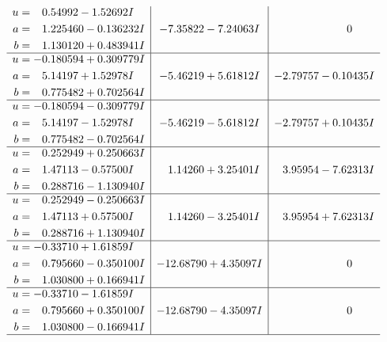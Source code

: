 \documentclass[1p]{elsarticle_modified}
\theoremstyle{definition}
\begin{document}
$$\begin{array}{c|c|c}
\begin{aligned}
u &= \phantom{-}0.54992 - 1.52692 I \\
a &= \phantom{-}1.225460 - 0.136232 I \\
b &= \phantom{-}1.130120 + 0.483941 I\end{aligned}
 & -7.35822 - 7.24063 I & \phantom{-0.000000 } 0 \\ \hline\begin{aligned}
u &= -0.180594 + 0.309779 I \\
a &= \phantom{-}5.14197 + 1.52978 I \\
b &= \phantom{-}0.775482 + 0.702564 I\end{aligned}
 & -5.46219 + 5.61812 I & -2.79757 - 0.10435 I \\ \hline\begin{aligned}
u &= -0.180594 - 0.309779 I \\
a &= \phantom{-}5.14197 - 1.52978 I \\
b &= \phantom{-}0.775482 - 0.702564 I\end{aligned}
 & -5.46219 - 5.61812 I & -2.79757 + 0.10435 I \\ \hline\begin{aligned}
u &= \phantom{-}0.252949 + 0.250663 I \\
a &= \phantom{-}1.47113 - 0.57500 I \\
b &= \phantom{-}0.288716 - 1.130940 I\end{aligned}
 & \phantom{-}1.14260 + 3.25401 I & \phantom{-}3.95954 - 7.62313 I \\ \hline\begin{aligned}
u &= \phantom{-}0.252949 - 0.250663 I \\
a &= \phantom{-}1.47113 + 0.57500 I \\
b &= \phantom{-}0.288716 + 1.130940 I\end{aligned}
 & \phantom{-}1.14260 - 3.25401 I & \phantom{-}3.95954 + 7.62313 I \\ \hline\begin{aligned}
u &= -0.33710 + 1.61859 I \\
a &= \phantom{-}0.795660 - 0.350100 I \\
b &= \phantom{-}1.030800 + 0.166941 I\end{aligned}
 & -12.68790 + 4.35097 I & \phantom{-0.000000 } 0 \\ \hline\begin{aligned}
u &= -0.33710 - 1.61859 I \\
a &= \phantom{-}0.795660 + 0.350100 I \\
b &= \phantom{-}1.030800 - 0.166941 I\end{aligned}
 & -12.68790 - 4.35097 I & \phantom{-0.000000 } 0\\
 \hline 
 \end{array}$$\newpage\newpage\renewcommand{\arraystretch}{1}
\end{document}
